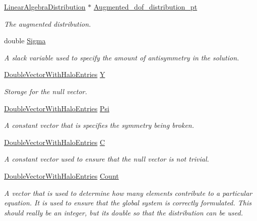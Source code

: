 \begin{DoxyCompactItemize}
\hyperlink{classoomph_1_1LinearAlgebraDistribution}{Linear\+Algebra\+Distribution} $\ast$ \hyperlink{classoomph_1_1PitchForkHandler_af6346c1dc77f3d4fb3dc8950afd91e0f}{Augmented\+\_\+dof\+\_\+distribution\+\_\+pt}
\begin{DoxyCompactList}\small\item\em The augmented distribution. \end{DoxyCompactList}\item 
double \hyperlink{classoomph_1_1PitchForkHandler_a56a173cbdf59e73728c9c1b8c5221817}{Sigma}
\begin{DoxyCompactList}\small\item\em A slack variable used to specify the amount of antisymmetry in the solution. \end{DoxyCompactList}\item 
\hyperlink{classoomph_1_1DoubleVectorWithHaloEntries}{Double\+Vector\+With\+Halo\+Entries} \hyperlink{classoomph_1_1PitchForkHandler_a289ce15584734b8ea50cd9a7f7f430ed}{Y}
\begin{DoxyCompactList}\small\item\em Storage for the null vector. \end{DoxyCompactList}\item 
\hyperlink{classoomph_1_1DoubleVectorWithHaloEntries}{Double\+Vector\+With\+Halo\+Entries} \hyperlink{classoomph_1_1PitchForkHandler_aa04d0f340d919d4da3f9199eb76649b1}{Psi}
\begin{DoxyCompactList}\small\item\em A constant vector that is specifies the symmetry being broken. \end{DoxyCompactList}\item 
\hyperlink{classoomph_1_1DoubleVectorWithHaloEntries}{Double\+Vector\+With\+Halo\+Entries} \hyperlink{classoomph_1_1PitchForkHandler_a88f5df169c44b02f4ba563cf42241599}{C}
\begin{DoxyCompactList}\small\item\em A constant vector used to ensure that the null vector is not trivial. \end{DoxyCompactList}\item 
\hyperlink{classoomph_1_1DoubleVectorWithHaloEntries}{Double\+Vector\+With\+Halo\+Entries} \hyperlink{classoomph_1_1PitchForkHandler_ad3f5fc1d7ee4918c9734e59e0611a62c}{Count}
\begin{DoxyCompactList}\small\item\em A vector that is used to determine how many elements contribute to a particular equation. It is used to ensure that the global system is correctly formulated. This should really be an integer, but its double so that the distribution can be used. \end{DoxyCompactList}\item 

\end{DoxyCompactItemize}
